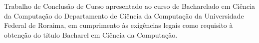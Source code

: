 \begin{titlepage}
    \begin{center}
        {\bfseries\LARGE 
            \makeatletter
            \@title
            \makeatother
        }\\[4cm]

        {\Large 
            \makeatletter
            \@author
            \makeatother
        }\\[4cm]

        \begin{flushright}
            \parbox{9cm}{\setlength{\parindent}{0pt}
            Trabalho de Conclusão de Curso apresentado ao curso de Bacharelado em Ciência da Computação do Departamento de Ciência da Computação da Universidade Federal de Roraima, em cumprimento às exigências legais como requisito à obtenção do título Bacharel em Ciência da Computação.
            }
        \end{flushright}


\end{center}
\end{titlepage}
